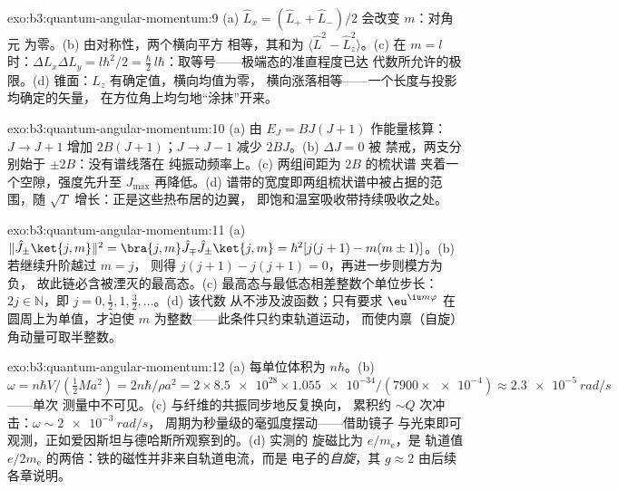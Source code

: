 \begin{solution}{exo:b3:quantum-angular-momentum:9}
(a) $\hat L_x = (\hat L_+ + \hat L_-)/2$ 会改变 $m$：对角元
为零。(b) 由对称性，两个横向平方
相等，其和为 $\langle\hat L^2 - \hat L_z^2\rangle$。(c)
在 $m = l$ 时：$\Delta L_x\Delta L_y = l\hbar^2/2 = \tfrac\hbar2
\,l\hbar$：取等号——极端态的准直程度已达
代数所允许的极限。(d) 锥面：$L_z$ 有确定值，横向均值为零，
横向涨落相等——一个长度与投影均确定的矢量，
在方位角上均匀地“涂抹”开来。
\end{solution}

\begin{solution}{exo:b3:quantum-angular-momentum:10}
(a) 由 $E_J = BJ(J+1)$ 作能量核算：$J \to J + 1$ 增加
$2B(J+1)$；$J \to J - 1$ 减少 $2BJ$。(b) $\Delta J = 0$ 被
禁戒，两支分别始于 $\pm 2B$：没有谱线落在
纯振动频率上。(c) 两组间距为 $2B$ 的梳状谱
夹着一个空隙，强度先升至 $J_{\max}$ 再降低。(d)
谱带的宽度即两组梳状谱中被占据的范围，随
$\sqrt{T}$ 增长：正是这些热布居的边翼，
即饱和温室吸收带持续吸收之处。
\end{solution}

\begin{solution}{exo:b3:quantum-angular-momentum:11}
(a) $\|\hat J_\pm\ket{j,m}\|^2 = \bra{j,m}\hat J_\mp\hat J_\pm
\ket{j,m} = \hbar^2[j(j+1) - m(m\pm1)]$。(b) 若继续升阶越过 $m = j$，
则得 $j(j+1) - j(j+1) = 0$，再进一步则模方为负，
故此链必含被湮灭的最高态。(c)
最高态与最低态相差整数个单位步长：$2j \in
\mathbb N$，即 $j = 0, \tfrac12, 1, \tfrac32, \dots$。(d) 该代数
从不涉及波函数；只有要求
$\eu^{\iu m\varphi}$ 在圆周上为单值，才迫使
$m$ 为整数——此条件只约束轨道运动，
而使内禀（自旋）角动量可取半整数。
\end{solution}

\begin{solution}{exo:b3:quantum-angular-momentum:12}
(a) 每单位体积为 $n\hbar$。(b) $\omega = n\hbar V/(\tfrac12 Ma^2)
= 2n\hbar/\rho a^2 = 2 \times \num{8.5e28} \times \num{1.055e-34}/
(7900 \times \num{e-4}) \approx \qty{2.3e-5}{rad/s}$——单次
测量中不可见。(c) 与纤维的共振同步地反复换向，
累积约 $\sim Q$ 次冲击：$\omega \sim \qty{2e-3}{rad/s}$，
周期为秒量级的毫弧度摆动——借助镜子
与光束即可观测，正如爱因斯坦与德哈斯所观察到的。(d) 实测的
旋磁比为 $e/m_{\text{e}}$，是
轨道值 $e/2m_{\text{e}}$ 的两倍：铁的磁性并非来自轨道电流，而是
电子的\emph{自旋}，其 $g \approx 2$ 由后续各章说明。
\end{solution}

